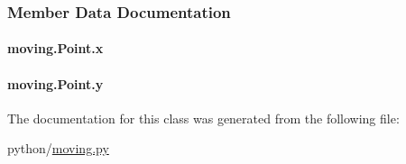 \subsubsection{Member Data Documentation}
\hypertarget{classmoving_1_1Point_ab402f7831ffa4f4398b90819496126ad}{
\paragraph[{x}]{\setlength{\rightskip}{0pt plus 5cm}moving.\-Point.\-x}}\label{classmoving_1_1Point_ab402f7831ffa4f4398b90819496126ad}
\hypertarget{classmoving_1_1Point_ae812508e0663bded8b2be4fc0b3584ff}{
\paragraph[{y}]{\setlength{\rightskip}{0pt plus 5cm}moving.\-Point.\-y}}\label{classmoving_1_1Point_ae812508e0663bded8b2be4fc0b3584ff}


The documentation for this class was generated from the following file\-:\begin{DoxyCompactItemize}
\item 
python/\hyperlink{moving_8py}{moving.\-py}\end{DoxyCompactItemize}
